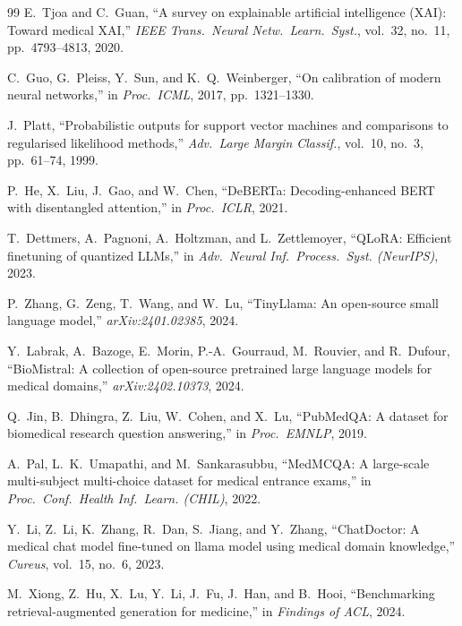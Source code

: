 \documentclass[conference,a4paper]{IEEEtran}
\begin{document}
\begin{thebibliography}{99}
E.\ Tjoa and C.\ Guan,
``A survey on explainable artificial intelligence (XAI): Toward medical
XAI,''
\emph{IEEE Trans.\ Neural Netw.\ Learn.\ Syst.}, vol.\ 32, no.\ 11,
pp.\ 4793--4813, 2020.

C.\ Guo, G.\ Pleiss, Y.\ Sun, and K.\ Q.\ Weinberger,
``On calibration of modern neural networks,''
in \emph{Proc.\ ICML}, 2017, pp.\ 1321--1330.

J.\ Platt,
``Probabilistic outputs for support vector machines and comparisons to
regularised likelihood methods,''
\emph{Adv.\ Large Margin Classif.}, vol.\ 10, no.\ 3, pp.\ 61--74, 1999.

P.\ He, X.\ Liu, J.\ Gao, and W.\ Chen,
``DeBERTa: Decoding-enhanced BERT with disentangled attention,''
in \emph{Proc.\ ICLR}, 2021.

T.\ Dettmers, A.\ Pagnoni, A.\ Holtzman, and L.\ Zettlemoyer,
``QLoRA: Efficient finetuning of quantized LLMs,''
in \emph{Adv.\ Neural Inf.\ Process.\ Syst. (NeurIPS)}, 2023.

P.\ Zhang, G.\ Zeng, T.\ Wang, and W.\ Lu,
``TinyLlama: An open-source small language model,''
\emph{arXiv:2401.02385}, 2024.

Y.\ Labrak, A.\ Bazoge, E.\ Morin, P.-A.\ Gourraud, M.\ Rouvier,
and R.\ Dufour,
``BioMistral: A collection of open-source pretrained large language models
for medical domains,''
\emph{arXiv:2402.10373}, 2024.

Q.\ Jin, B.\ Dhingra, Z.\ Liu, W.\ Cohen, and X.\ Lu,
``PubMedQA: A dataset for biomedical research question answering,''
in \emph{Proc.\ EMNLP}, 2019.

A.\ Pal, L.\ K.\ Umapathi, and M.\ Sankarasubbu,
``MedMCQA: A large-scale multi-subject multi-choice dataset for medical
entrance exams,''
in \emph{Proc.\ Conf.\ Health Inf.\ Learn. (CHIL)}, 2022.

Y.\ Li, Z.\ Li, K.\ Zhang, R.\ Dan, S.\ Jiang, and Y.\ Zhang,
``ChatDoctor: A medical chat model fine-tuned on llama model using medical
domain knowledge,''
\emph{Cureus}, vol.\ 15, no.\ 6, 2023.

M.\ Xiong, Z.\ Hu, X.\ Lu, Y.\ Li, J.\ Fu, J.\ Han, and B.\ Hooi,
``Benchmarking retrieval-augmented generation for medicine,''
in \emph{Findings of ACL}, 2024.

\end{thebibliography}
\end{document}
